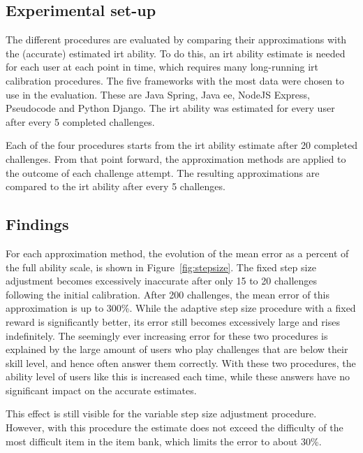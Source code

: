 \subsection{Experimental set-up}
The different procedures are evaluated by comparing their approximations with the (accurate) estimated \gls{irt} ability.
To do this, an \gls{irt} ability estimate is needed for each user at each point in time, which requires many long-running \gls{irt} calibration procedures.
The five frameworks with the most data were chosen to use in the evaluation.
These are Java Spring, Java \gls{ee}, NodeJS Express, Pseudocode and Python Django.
The \gls{irt} ability was estimated for every user after every 5 completed challenges.

Each of the four procedures starts from the \gls{irt} ability estimate after 20 completed challenges.
From that point forward, the approximation methods are applied to the outcome of each challenge attempt.
The resulting approximations are compared to the \gls{irt} ability after every 5 challenges.

\subsection{Findings}
For each approximation method, the evolution of the mean error as a percent of the full ability scale, is shown in Figure~\ref{fig:stepsize}.
The fixed step size adjustment becomes excessively inaccurate after only 15 to 20 challenges following the initial calibration.
After 200 challenges, the mean error of this approximation is up to 300\%.
While the adaptive step size procedure with a fixed reward is significantly better, its error still becomes excessively large and rises indefinitely.
The seemingly ever increasing error for these two procedures is explained by the large amount of users who play challenges that are below their skill level, and hence often answer them correctly.
With these two procedures, the ability level of users like this is increased each time, while these answers have no significant impact on the accurate estimates.

This effect is still visible for the variable step size adjustment procedure.
However, with this procedure the estimate does not exceed the difficulty of the most difficult item in the item bank, which limits the error to about 30\%.

